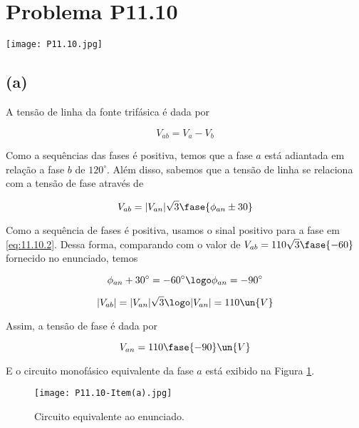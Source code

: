
\section*{Problema P11.10}

\renewcommand*\thesection{11.10}

\begin{center}
    \texttt{[image: P11.10.jpg]}
\end{center}

\subsection*{(a)}

A tensão de linha da fonte trifásica é dada por  

\begin{equation}\label{eq:11.10.1}
    V_{ab} = V_a - V_b
\end{equation}

Como a sequências das fases é positiva, temos que a fase $a$ está adiantada em relação a fase $b$ de $120^{\circ}$.
Além disso, sabemos que a tensão de linha se relaciona com a tensão de fase através de    

\begin{equation}\label{eq:11.10.2}
    V_{ab} = |V_{an}|\sqrt{3}\fase{\phi_{an} \pm 30}
\end{equation}

Como a sequência de fases é positiva, usamos o sinal positivo para a fase em \eqref{eq:11.10.2}. Dessa forma, comparando
com o valor de $V_{ab} = 110\sqrt{3}\fase{-60}$ fornecido no enunciado, temos 

\[ \phi_{an} + 30^{\circ} = -60^{\circ} \logo \phi_{an} = -90^{\circ} \]

\[ |V_{ab}| = |V_{an}|\sqrt{3} \logo |V_{an}| = 110 \un{V} \]

Assim, a tensão de fase é dada por   

\[ V_{an} = 110\fase{-90} \un{V} \]

E o circuito monofásico equivalente da fase $a$ está exibido na Figura \ref*{fig:11.10.1}.

\begin{figure}[hb]
    \centering
    \caption{Circuito equivalente ao enunciado.}
      \centering
      \texttt{[image: P11.10-Item(a).jpg]} \\
    \label{fig:11.10.1}
\end{figure}

